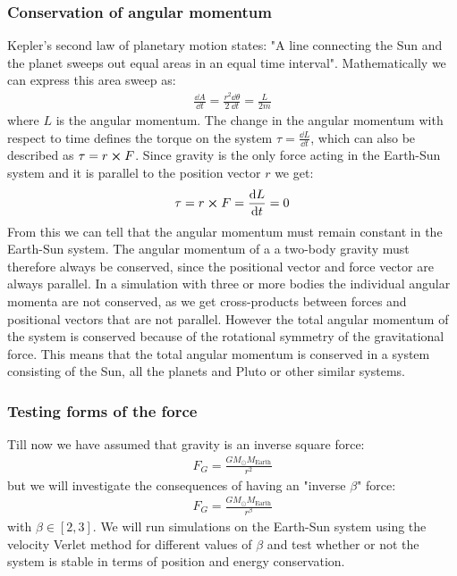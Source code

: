 \documentclass[american,a4paper,12pt]{article}
\newcommand{\ME}{\ensuremath{M_{\text{Earth}}}} %
\newcommand{\MS}{\ensuremath{M_{\odot}}} %
\begin{document}
\subsubsection{Conservation of angular momentum}
Kepler's second law of planetary motion states: "A line connecting the Sun and the planet sweeps out equal areas in an equal time interval"\cite{kepler}. Mathematically we can express this area sweep as:
\begin{align*}
    \frac{\dd A}{\dd t} = \frac{r^2 \dd \theta}{2\ \dd t} = \frac{L}{2m}
\end{align*}
where $L$ is the angular momentum. The change in the angular momentum with respect to time defines the torque on the system $\tau = \frac{\dd L}{\dd t}$, which can also be described as $\tau = r \cross F$. Since gravity is the only force acting in the Earth-Sun system and it is parallel to the position vector $r$ we get:
\begin{align*}
    \tau = r \cross F = \frac{\dd L}{\dd t} = 0
\end{align*}
From this we can tell that the angular momentum must remain constant in the Earth-Sun system.
The angular momentum of a a two-body gravity must therefore always be conserved, since the positional vector and force vector are always parallel. In a simulation with three or more bodies the individual angular momenta are not conserved, as we get cross-products between forces and positional vectors that are not parallel. However the total angular momentum of the system is conserved because of the rotational symmetry of the gravitational force. This means that the total angular momentum is conserved in a system consisting of the Sun, all the planets and Pluto or other similar systems.

\newpage
\subsubsection{Testing forms of the force}
Till now we have assumed that gravity is an inverse square force:
\begin{align*}
    F_G = \frac{G\MS\ME}{r^2}
\end{align*}
but we will investigate the consequences of having an "inverse $\beta$" force:
\begin{align*}
    F_G = \frac{G\MS\ME}{r^{\beta}}
\end{align*}
with $\beta \in [2,3]$. We will run simulations on the Earth-Sun system using the velocity Verlet method for different values of $\beta$ and test whether or not the system is stable in terms of position and energy conservation. 
\end{document}
